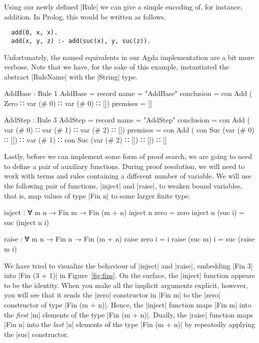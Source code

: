 \documentclass[preprint]{sigplanconf}
\begin{document}
Using our newly defined |Rule| we can give a simple encoding of, for
instance, addition. In Prolog, this would be written as follows.

\begin{verbatim}
  add(0, x, x).
  add(x, y, z) :- add(suc(x), y, suc(z)).
\end{verbatim}

Unfortunately, the named equivalents in our Agda implementation are a
bit more verbose. Note that we have, for the sake of this example,
instantiated the abstract |RuleName| with the |String| type.

\begin{code}
AddBase : Rule 1
AddBase = record {
  name        = "AddBase"
  conclusion  = con Add  (  Zero
                         ∷  var (# 0)
                         ∷  var (# 0)
                         ∷ [])
  premises    = []
  }
\end{code}

\begin{code}
AddStep : Rule 3
AddStep = record {
  name        = "AddStep"
  conclusion  =  con Add  (  var (# 0)
                          ∷  var (# 1)
                          ∷  var (# 2)
                          ∷ [])
  premises    =  con Add  (  con Suc (var (# 0) ∷ [])
                          ∷  var (# 1)
                          ∷  con Suc (var (# 2) ∷ [])
                          ∷ [])
                 ∷ []
  }
\end{code}

Lastly, before we can implement some form of proof search, we are
going to need to define a pair of auxiliary functions. During proof
resolution, we will need to work with terms and rules containing a
different number of variable. We will use the following pair of
functions, |inject| and |raise|, to weaken bound variables, that is,
map values of type |Fin n| to some larger finite type.
\begin{code}
  inject : ∀ {m} n → Fin m → Fin (m + n)
  inject n  zero    = zero
  inject n (suc i)  = suc (inject n i)

  raise : ∀ m {n} → Fin n → Fin (m + n)
  raise  zero   i  = i
  raise (suc m) i  = suc (raise m i)
\end{code}
We have tried to visualize the behaviour of |inject| and |raise|,
embedding |Fin 3| into |Fin (3 + 1)| in Figure~\ref{fig:fins}. On the
surface, the |inject| function appears to be the identity. When you
make all the implicit arguments explicit, however, you will see that
it sends the |zero| constructor in |Fin m| to the |zero| constructor
of type |Fin (m + n)|. Hence, the |inject| function maps |Fin m| into the
\emph{first} |m| elements of the type |Fin (m + n)|. Dually, the
|raise| function maps |Fin n| into the \emph{last} |n| elements of the
type |Fin (m + n)| by repeatedly applying the |suc| constructor.
\end{document}
